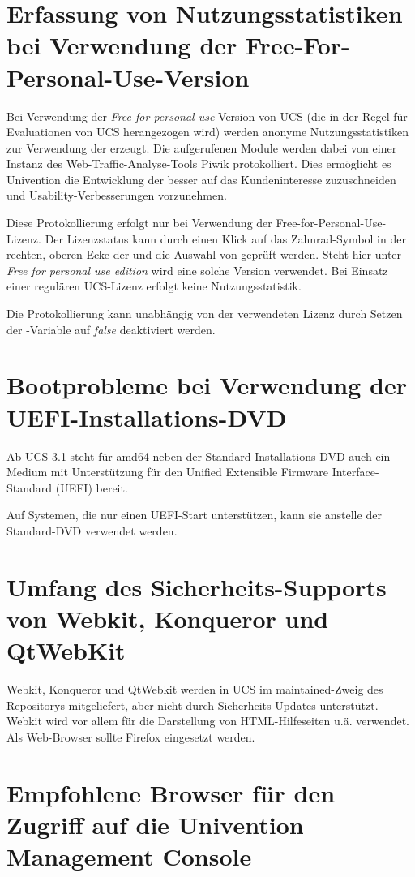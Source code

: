 \section{Erfassung von Nutzungsstatistiken bei Verwendung der Free-For-Personal-Use-Version}
Bei Verwendung der  \emph{Free for personal use}-Version
von UCS (die in der Regel für Evaluationen von UCS herangezogen wird)
werden anonyme Nutzungsstatistiken zur Verwendung der \ucsUMC{}
erzeugt. Die aufgerufenen Module werden dabei von einer Instanz des
Web-Traffic-Analyse-Tools Piwik protokolliert. Dies ermöglicht es
Univention die Entwicklung der \ucsUMC{} besser auf das
Kundeninteresse zuzuschneiden und Usability-Verbesserungen vorzunehmen.

Diese Protokollierung erfolgt nur bei Verwendung der 
Free-for-Personal-Use-Lizenz. Der Lizenzstatus kann durch einen
Klick auf das Zahnrad-Symbol in der rechten, oberen Ecke der \ucsUMC{}
und die Auswahl von  geprüft werden. Steht hier
unter  \emph{Free for personal use edition}
wird eine solche Version verwendet. Bei Einsatz einer regulären
UCS-Lizenz erfolgt keine Nutzungsstatistik.

Die Protokollierung kann unabhängig von der verwendeten Lizenz durch
Setzen der \ucsUCR{}-Variable   auf \emph{false} deaktiviert
werden.

\section{Bootprobleme bei Verwendung der UEFI-Installations-DVD}
Ab UCS 3.1 steht für amd64 neben der Standard-Installations-DVD auch
ein Medium mit Unterstützung für den Unified Extensible Firmware
Interface-Standard (UEFI) bereit.

Auf Systemen, die nur einen UEFI-Start unterstützen, kann sie anstelle
der Standard-DVD verwendet werden.

\section{Umfang des Sicherheits-Supports von Webkit, Konqueror und QtWebKit}
Webkit, Konqueror und QtWebkit werden in UCS im maintained-Zweig des
Repositorys mitgeliefert, aber nicht durch Sicherheits-Updates
unterstützt. Webkit wird vor allem für die Darstellung von
HTML-Hilfeseiten u.ä. verwendet. Als Web-Browser sollte Firefox
eingesetzt werden.

\section{Empfohlene Browser für den Zugriff auf die Univention Management Console}


